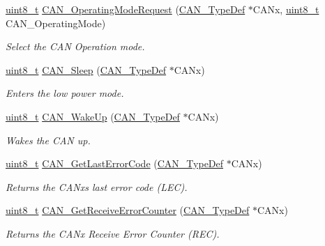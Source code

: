 \begin{DoxyCompactItemize}
\hyperlink{_p_e___types_8h_aba7bc1797add20fe3efdf37ced1182c5}{uint8\+\_\+t} \hyperlink{group___c_a_n___private___functions_gab2a3630e9e3024114eb117d14e514208}{C\+A\+N\+\_\+\+Operating\+Mode\+Request} (\hyperlink{struct_c_a_n___type_def}{C\+A\+N\+\_\+\+Type\+Def} $\ast$C\+A\+Nx, \hyperlink{_p_e___types_8h_aba7bc1797add20fe3efdf37ced1182c5}{uint8\+\_\+t} C\+A\+N\+\_\+\+Operating\+Mode)
\begin{DoxyCompactList}\small\item\em Select the C\+AN Operation mode. \end{DoxyCompactList}\item 
\hyperlink{_p_e___types_8h_aba7bc1797add20fe3efdf37ced1182c5}{uint8\+\_\+t} \hyperlink{group___c_a_n___private___functions_ga640215e38765759d7eceb8a039046667}{C\+A\+N\+\_\+\+Sleep} (\hyperlink{struct_c_a_n___type_def}{C\+A\+N\+\_\+\+Type\+Def} $\ast$C\+A\+Nx)
\begin{DoxyCompactList}\small\item\em Enters the low power mode. \end{DoxyCompactList}\item 
\hyperlink{_p_e___types_8h_aba7bc1797add20fe3efdf37ced1182c5}{uint8\+\_\+t} \hyperlink{group___c_a_n___private___functions_ga78cdfbf1884b9e33c552bcbca15bed10}{C\+A\+N\+\_\+\+Wake\+Up} (\hyperlink{struct_c_a_n___type_def}{C\+A\+N\+\_\+\+Type\+Def} $\ast$C\+A\+Nx)
\begin{DoxyCompactList}\small\item\em Wakes the C\+AN up. \end{DoxyCompactList}\item 
\hyperlink{_p_e___types_8h_aba7bc1797add20fe3efdf37ced1182c5}{uint8\+\_\+t} \hyperlink{group___c_a_n___private___functions_gaaee721a392b6b21bfd15dc160aeb6924}{C\+A\+N\+\_\+\+Get\+Last\+Error\+Code} (\hyperlink{struct_c_a_n___type_def}{C\+A\+N\+\_\+\+Type\+Def} $\ast$C\+A\+Nx)
\begin{DoxyCompactList}\small\item\em Returns the C\+A\+Nx\textquotesingle{}s last error code (L\+EC). \end{DoxyCompactList}\item 
\hyperlink{_p_e___types_8h_aba7bc1797add20fe3efdf37ced1182c5}{uint8\+\_\+t} \hyperlink{group___c_a_n___private___functions_ga6903eecbec40eb1361d915ddde9a3274}{C\+A\+N\+\_\+\+Get\+Receive\+Error\+Counter} (\hyperlink{struct_c_a_n___type_def}{C\+A\+N\+\_\+\+Type\+Def} $\ast$C\+A\+Nx)
\begin{DoxyCompactList}\small\item\em Returns the C\+A\+Nx Receive Error Counter (R\+EC). \end{DoxyCompactList}\item 

\end{DoxyCompactItemize}
